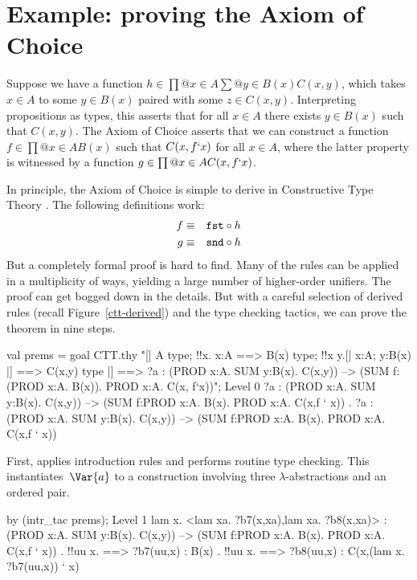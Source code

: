 \section{Example: proving the Axiom of Choice} \label{ctt-choice}
Suppose we have a function $h\in \prod@{x\in A}\sum@{y\in B(x)} C(x,y)$,
which takes $x\in A$ to some $y\in B(x)$ paired with some $z\in C(x,y)$.
Interpreting propositions as types, this asserts that for all $x\in A$
there exists $y\in B(x)$ such that $C(x,y)$.  The Axiom of Choice asserts
that we can construct a function $f\in \prod@{x\in A}B(x)$ such that
$C(x,f{\tt`}x)$ for all $x\in A$, where the latter property is witnessed by a
function $g\in \prod@{x\in A}C(x,f{\tt`}x)$.

In principle, the Axiom of Choice is simple to derive in Constructive Type
Theory \cite[page~50]{martinlof84}.  The following definitions work:
\begin{eqnarray*}
    f & \equiv & {\tt fst} \circ h \\
    g & \equiv & {\tt snd} \circ h
\end{eqnarray*}
But a completely formal proof is hard to find.  Many of the rules can be
applied in a multiplicity of ways, yielding a large number of higher-order
unifiers.  The proof can get bogged down in the details.  But with a
careful selection of derived rules (recall Figure~\ref{ctt-derived}) and
the type checking tactics, we can prove the theorem in nine steps.
\begin{ttbox}
val prems = goal CTT.thy
    "[| A type;  !!x. x:A ==> B(x) type;              \ttback
\ttback       !!x y.[| x:A;  y:B(x) |] ==> C(x,y) type      \ttback
\ttback    |] ==> ?a :    (PROD x:A. SUM y:B(x). C(x,y))    \ttback
\ttback               --> (SUM f: (PROD x:A. B(x)). PROD x:A. C(x, f`x))";
{\out Level 0}
{\out ?a : (PROD x:A. SUM y:B(x). C(x,y)) -->}
{\out      (SUM f:PROD x:A. B(x). PROD x:A. C(x,f ` x))}
{. ?a : (PROD x:A. SUM y:B(x). C(x,y)) -->}
{\out          (SUM f:PROD x:A. B(x). PROD x:A. C(x,f ` x))}
\end{ttbox}
First,  applies introduction rules and performs routine
type checking.  This instantiates~$\Var{a}$ to a construction involving
three $\lambda$-abstractions and an ordered pair.
\begin{ttbox}
by (intr_tac prems);
{\out Level 1}
{\out lam x. <lam xa. ?b7(x,xa),lam xa. ?b8(x,xa)>}
{\out : (PROD x:A. SUM y:B(x). C(x,y)) -->}
{\out   (SUM f:PROD x:A. B(x). PROD x:A. C(x,f ` x))}
{. !!uu x.}
{ ==>}
{\out        ?b7(uu,x) : B(x)}
{. !!uu x.}
{ ==>}
{\out        ?b8(uu,x) : C(x,(lam x. ?b7(uu,x)) ` x)}
\end{ttbox}
